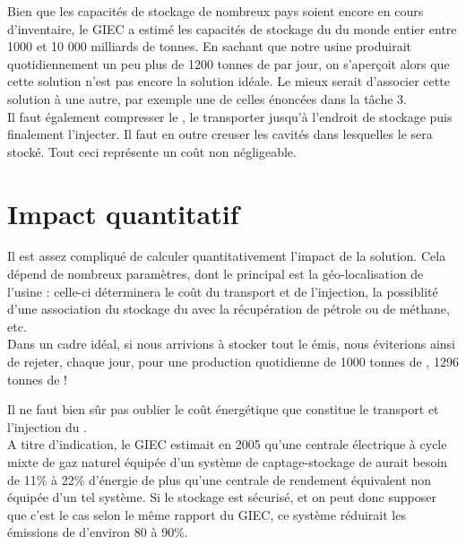 \documentclass[10pt, a4, oneside, headings=normal]{scrartcl}
\begin{document}
Bien que les capacités de stockage de nombreux pays soient encore en cours d'inventaire, le GIEC a estimé les capacités de stockage du  du monde entier entre 1000 et 10 000 milliards de tonnes. En sachant que notre usine produirait quotidiennement un peu plus de 1200 tonnes de  par jour, on s'aperçoit alors que cette solution n'est pas encore la solution idéale. Le mieux serait d'associer cette solution à une autre, par exemple une de celles énoncées dans la tâche 3.
\\

Il faut également compresser le , le transporter jusqu'à l'endroit de stockage puis finalement l'injecter. Il faut en outre creuser les cavités dans lesquelles le  sera stocké. Tout ceci représente un coût non négligeable.

\section{Impact quantitatif}
Il est assez compliqué de calculer quantitativement l'impact de la solution. Cela dépend de nombreux paramètres, dont le principal est la géo-localisation de l'usine : celle-ci déterminera le coût du transport et de l'injection, la possiblité d'une association du stockage du  avec la récupération de pétrole ou de méthane, etc.
\\

Dans un cadre idéal, si nous arrivions à stocker tout le  émis, nous éviterions ainsi de rejeter, chaque jour, pour une production quotidienne de 1000 tonnes de , 1296 tonnes de  !


Il ne faut bien sûr pas oublier le coût énergétique que constitue le transport et l'injection du .
\\

A titre d'indication, le GIEC estimait en 2005 qu'une centrale électrique à cycle mixte de gaz naturel équipée d'un système de captage-stockage de  aurait besoin de 11\% à 22\% d'énergie de plus qu'une centrale de rendement équivalent non équipée d'un tel système. Si le stockage est sécurisé, et on peut donc supposer que c'est le cas selon le même rapport du GIEC, ce système réduirait les émissions de  d'environ 80 à 90\%.
\end{document}
